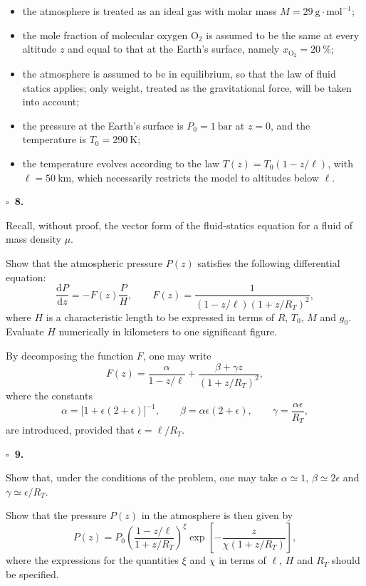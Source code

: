 \documentclass[11pt,a4paper]{article}
\newcommand{\question}[1]{%
  \par\medskip\noindent\textbf{\(\square\)\ #1.}\quad%
}
\begin{document}
\begin{itemize}
\item the atmosphere is treated as an ideal gas with molar mass \(M=29~\mathrm{g}\cdot\mathrm{mol}^{-1}\);
\item the mole fraction of molecular oxygen \(\mathrm{O}_2\) is assumed to be the same at every altitude \(z\) and equal to that at the Earth's surface, namely \(x_{\mathrm{O}_2}=20~\%\);
\item the atmosphere is assumed to be in equilibrium, so that the law of fluid statics applies; only weight, treated as the gravitational force, will be taken into account;
\item the pressure at the Earth's surface is \(P_0=1~\mathrm{bar}\) at \(z=0\), and the temperature is \(T_0=290~\mathrm{K}\);
\item the temperature evolves according to the law \(T(z)=T_0(1-z/\ell)\), with \(\ell=50~\mathrm{km}\), which necessarily restricts the model to altitudes below \(\ell\).
\end{itemize}

\question{8}
Recall, without proof, the vector form of the fluid-statics equation for a fluid of mass density \(\mu\).

Show that the atmospheric pressure \(P(z)\) satisfies the following differential equation:
\begin{equation*}
\frac{\mathrm{d}P}{\mathrm{d}z}
= -F(z)\frac{P}{H},
\qquad
F(z)=\frac{1}{(1-z/\ell)(1+z/R_T)^2},
\end{equation*}
where \(H\) is a characteristic length to be expressed in terms of \(R\), \(T_0\), \(M\) and \(g_0\). Evaluate \(H\) numerically in kilometers to one significant figure.

By decomposing the function \(F\), one may write
\begin{equation*}
F(z)=\frac{\alpha}{1-z/\ell}
+\frac{\beta+\gamma z}{(1+z/R_T)^2},
\end{equation*}
where the constants
\[
\alpha=\bigl[1+\epsilon(2+\epsilon)\bigr]^{-1},
\qquad
\beta=\alpha\epsilon(2+\epsilon),
\qquad
\gamma=\frac{\alpha\epsilon}{R_T},
\]
are introduced, provided that \(\epsilon=\ell/R_T\).

\question{9}
Show that, under the conditions of the problem, one may take \(\alpha\simeq 1\), \(\beta\simeq 2\epsilon\) and \(\gamma\simeq \epsilon/R_T\).

Show that the pressure \(P(z)\) in the atmosphere is then given by
\begin{equation}
P(z)=P_0
\left(\frac{1-z/\ell}{1+z/R_T}\right)^\xi
\exp\left[-\frac{z}{\chi(1+z/R_T)}\right],
\label{eq:pression}
\end{equation}
where the expressions for the quantities \(\xi\) and \(\chi\) in terms of \(\ell\), \(H\) and \(R_T\) should be specified.
\end{document}
